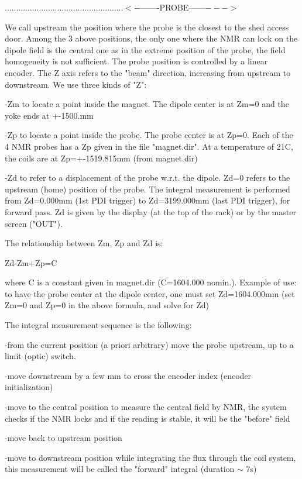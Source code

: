 {....................................................$<-$-------PROBE------$--->$ 

We call upstream the position where the probe is the closest to the shed access
door. Among the 3 above positions, the only one where the NMR can lock on the 
dipole
field is the central one as in the extreme position of the probe, the field 
homogeneity
is not sufficient. The probe position is controlled by a linear encoder. The
Z axis refers to the "beam" direction, increasing from upstream
to downstream. We use three kinds of "Z": 

-Zm to locate a point inside the magnet. The dipole center is at Zm=0 and the
yoke ends at +-1500.mm 

-Zp to locate a point inside the probe. The probe center is at Zp=0. Each of
the 4 NMR probes has a Zp given in the file "magnet.dir".
At a temperature of 21C, the coils are at Zp=+-1519.815mm (from magnet.dir) 

-Zd to refer to a displacement of the probe w.r.t. the dipole. Zd=0 refers to
the upstream (home) position of the probe. The integral measurement is performed
from Zd=0.000mm (1st PDI trigger) to Zd=3199.000mm (last PDI trigger), for forward
pass. Zd is given by the display (at the top of the rack) or by the master screen
("OUT"). 

The relationship between Zm, Zp and Zd is: 

Zd-Zm+Zp=C 

where C is a constant given in magnet.dir (C=1604.000 nomin.). Example of use:
to have the probe center at the dipole center, one must set Zd=1604.000mm (set
Zm=0 and Zp=0 in the above formula, and solve for Zd) 

The integral measurement sequence is the following: 

-from the current position (a priori arbitrary) move the probe upstream, up
to a limit (optic) switch. 

-move downstream by a few mm to cross the encoder index (encoder initialization) 

-move to the central position to measure the central field by NMR, the system
checks if the NMR locks and if the reading is stable, it will be the 
"before"
field 

-move back to upstream position 

-move to downstream position while integrating the flux through the coil system,
this measurement will be called the "forward" integral (duration
\( \sim  \) 7s) 

}
